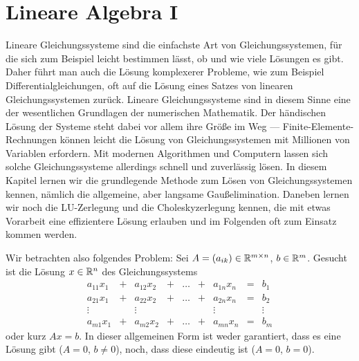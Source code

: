 % 
\chapter{Lineare Algebra \textrm{I}}

Lineare Gleichungssysteme sind die einfachste Art von
Gleichungssystemen, für die sich zum Beispiel leicht bestimmen lässt,
ob und wie viele Lösungen es gibt. Daher führt man auch die Lösung
komplexerer Probleme, wie zum Beispiel Differentialgleichungen, oft
auf die Lösung eines Satzes von linearen Gleichungssystemen
zurück. Lineare Gleichungssysteme sind in diesem Sinne eine der
wesentlichen Grundlagen der numerischen Mathematik. Der händischen
Lösung der Systeme steht dabei vor allem ihre Größe im Weg ---
Finite-Elemente-Rechnungen können leicht die Lösung von
Gleichungssystemen mit Millionen von Variablen erfordern. Mit modernen
Algorithmen und Computern lassen sich solche Gleichungssysteme
allerdings schnell und zuverlässig lösen. In diesem Kapitel lernen wir
die grundlegende Methode zum Lösen von Gleichungssystemen kennen,
nämlich die allgemeine, aber langsame Gaußelimination. Daneben lernen
wir noch die LU-Zerlegung und die Choleskyzerlegung kennen, die mit
etwas Vorarbeit eine effizientere Lösung erlauben und im Folgenden oft
zum Einsatz kommen werden.

Wir betrachten also folgendes Problem: Sei $A=(a_{ik})\in\mathbb{R}^{m\times
  n}$, $b\in\mathbb{R}^m$. Gesucht ist die Lösung $x\in\mathbb{R}^n$ des
Gleichungssystems
\begin{equation}
  \label{eq:lgs}
  \begin{matrix}
    a_{11}x_1 &+&  a_{12}x_2 &+& \ldots &+& a_{1n}x_n &=& b_1\\
    a_{21}x_1 &+&  a_{22}x_2 &+& \ldots &+& a_{2n}x_n &=& b_2\\
    \vdots   &&   \vdots   &&         && \vdots  && \vdots\\
    a_{m1}x_1 &+&  a_{m2}x_2 &+& \ldots &+& a_{mn}x_n &=& b_m
  \end{matrix}
\end{equation}
oder kurz $Ax=b$. In dieser allgemeinen Form ist weder garantiert,
dass es eine Lösung gibt (\zb $A=0$, $b\neq 0$), noch, dass diese
eindeutig ist ($A=0$, $b=0$).

